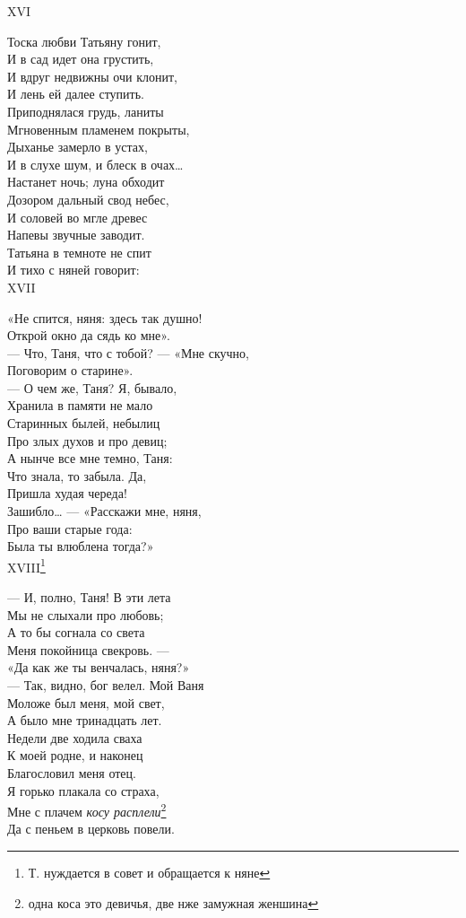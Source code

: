 XVI

Тоска любви Татьяну гонит,\\
И в сад идет она грустить,\\
И вдруг недвижны очи клонит,\\
И лень ей далее ступить.\\
Приподнялася грудь, ланиты\\
Мгновенным пламенем покрыты,\\
Дыханье замерло в устах,\\
И в слухе шум, и блеск в очах…\\
Настанет ночь; луна обходит\\
Дозором дальный свод небес,\\
И соловей во мгле древес\\
Напевы звучные заводит.\\
Татьяна в темноте не спит\\
И тихо с няней говорит:\\

XVII

«Не спится, няня: здесь так душно!\\
Открой окно да сядь ко мне».\\
— Что, Таня, что с тобой? — «Мне скучно,\\
Поговорим о старине».\\
— О чем же, Таня? Я, бывало,\\
Хранила в памяти не мало\\
Старинных былей, небылиц\\
Про злых духов и про девиц;\\
А нынче все мне темно, Таня:\\
Что знала, то забыла. Да,\\
Пришла худая череда!\\
Зашибло… — «Расскажи мне, няня,\\
Про ваши старые года:\\
Была ты влюблена тогда?»\\

XVIII\footnote{Т. нуждается в совет и обращается к няне}

— И, полно, Таня! В эти лета\\
Мы не слыхали про любовь;\\
А то бы согнала со света\\
Меня покойница свекровь. —\\
«Да как же ты венчалась, няня?»\\
— Так, видно, бог велел. Мой Ваня\\
Моложе был меня, мой свет,\\
А было мне тринадцать лет.\\
Недели две ходила сваха\\
К моей родне, и наконец\\
Благословил меня отец.\\
Я горько плакала со страха,\\
Мне с плачем \emph{косу расплели}\footnote{одна коса это девичья, две нже замужная женшина}\\
Да с пеньем в церковь повели.\\

